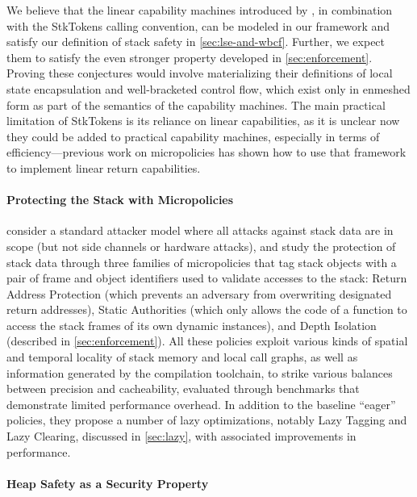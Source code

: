 \documentclass[acmsmall,review,anonymous]{acmart}\settopmatter{printfolios=true,printccs=false,printacmref=false}
\begin{document}
{{We believe that the linear capability machines introduced by
\citep{Skorstengaard+19}, in combination with the StkTokens calling convention,
can be modeled in our framework and satisfy our definition of stack safety in
\cref{sec:lse-and-wbcf}. Further, we expect them to satisfy the even stronger
property developed in \cref{sec:enforcement}. Proving these conjectures would
involve materializing their definitions of local state encapsulation and
well-bracketed control flow, which exist only in enmeshed form as part of the
semantics of the capability machines. The main practical limitation of StkTokens
is its reliance on linear capabilities, as it is unclear now they could be added
to practical capability machines, especially in terms of efficiency---previous
work on micropolicies \citep{yannis-report} has shown how to use that framework
to implement linear return capabilities.

\paragraph{Protecting the Stack with Micropolicies}
%
\citet{DBLP:conf/sp/RoesslerD18} consider a standard attacker model where all
attacks against stack data are in scope (but not side channels or hardware
attacks), and study the protection of stack data through three families of
micropolicies that tag stack objects with a pair of frame and object identifiers
used to validate accesses to the stack: Return Address Protection (which
prevents an adversary from overwriting designated return addresses), Static
Authorities (which only allows the code of a function to access the stack frames
of its own dynamic instances), and Depth Isolation (described in
\cref{sec:enforcement}). All these policies exploit various kinds of spatial and
temporal locality of stack memory and local call graphs, as well as information
generated by the compilation toolchain, to strike various balances between
precision and cacheability, evaluated through benchmarks that demonstrate
limited performance overhead. In addition to the baseline ``eager'' policies,
they propose a number of lazy optimizations, notably Lazy Tagging and Lazy
Clearing, discussed in \cref{sec:lazy}, with associated improvements in
performance.

\paragraph{Heap Safety as a Security Property}

}}
\end{document}
